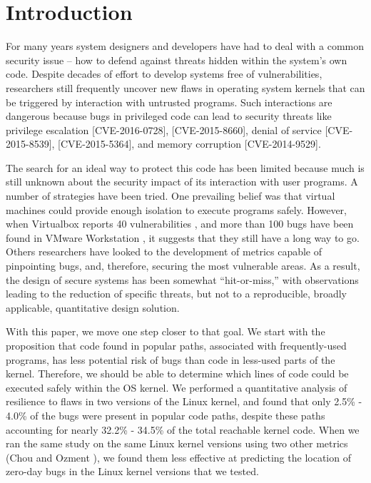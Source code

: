 \section{Introduction}
\label{sec.introduction}

For many years system designers and developers have had to deal with a common security issue --
how to defend against threats hidden within the system's own code. Despite
 decades of effort to develop systems free of vulnerabilities, researchers still
frequently uncover new flaws in operating system kernels that can be triggered by
interaction with untrusted programs. Such interactions are dangerous because
bugs in privileged code can lead to security threats like privilege escalation
 [CVE-2016-0728], [CVE-2015-8660], denial of service [CVE-2015-8539], [CVE-2015-5364],
  and memory corruption [CVE-2014-9529].

The search for an ideal way to protect this code has been limited because much is
 still unknown about the security impact of its interaction with user programs.
A number of strategies have been tried. One prevailing belief was that virtual
machines could provide enough isolation to execute programs safely.
However, when Virtualbox reports 40 vulnerabilities \cite{Virtualbox-Vulnerabilities},
 and more than 100 bugs have been found in VMware Workstation \cite{PittSFIeld, ozment2006milk},
it suggests that they still have a long way to go. Others researchers have looked to the development of
 metrics capable of pinpointing bugs, and, therefore, securing the most
 vulnerable areas. As a result, the design of
 secure systems has been somewhat “hit-or-miss,” with observations leading to
 the reduction of specific threats, but not to a reproducible, broadly applicable,
quantitative design solution.

With this paper, we move one step closer to that goal. We start with the proposition
 that code found in popular paths, associated with frequently-used programs,
has less potential risk of bugs than code in less-used parts of the kernel.
Therefore, we should be able to determine which lines of code could be executed
 safely within the OS kernel. We performed a quantitative analysis of resilience
  to flaws in two versions of the Linux kernel, and
found that only 2.5\% - 4.0\% of the bugs were present in popular code paths,
despite these paths accounting for nearly 32.2\% - 34.5\% of the total reachable kernel code.
When we ran the same study on the same Linux kernel versions using two other metrics
(Chou \cite{PittSFIeld} and Ozment \cite{ozment2006milk}),
we found them less effective at predicting the location of zero-day bugs in the
Linux kernel versions that we tested.

